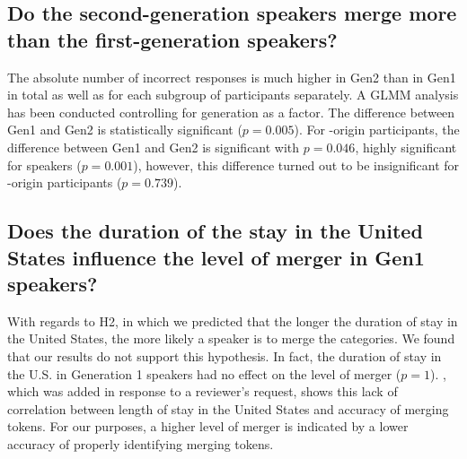 \documentclass[output=paper,modfonts,newtxmath,hidelinks,]{langscibook}
\begin{document}
\subsection{Do the second-generation speakers merge more than the first-generation speakers?}\label{sec:mihajlovic:5.2}

The absolute number of incorrect responses is much higher in Gen2 than in Gen1 in total as well as for each subgroup of participants separately. A GLMM analysis has been conducted controlling for generation as a factor. The difference between Gen1 and Gen2 is statistically significant ($p=0.005$). For -origin participants, the difference between Gen1 and Gen2 is significant with $p=0.046$, highly significant for  speakers ($p=0.001$), however, this difference turned out to be insignificant for -origin participants ($p=0.739$).


\subsection{Does the duration of the stay in the United States influence the level of merger in Gen1 speakers?}\label{sec:mihajlovic:5.3}

With regards to H2, in which we predicted that the longer the duration of stay in the United States, the more likely a speaker is to merge the categories. We found that our results do not support this hypothesis. In fact, the duration of stay in the U.S. in Generation 1 speakers had no effect on the level of merger ($p=1$). , which was added in response to a reviewer’s request, shows this lack of correlation between length of stay in the United States and accuracy of merging tokens. For our purposes, a higher level of merger is indicated by a lower accuracy of properly identifying merging tokens.
\end{document}
